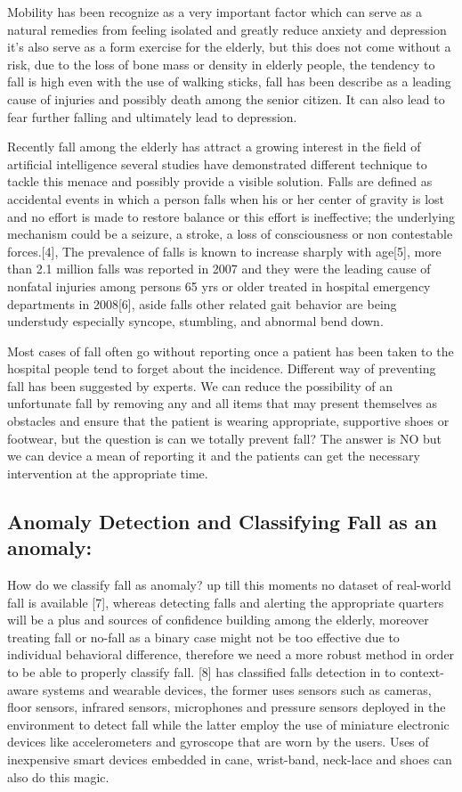 \documentclass[a4paper, parskip=full]{scrartcl}
\begin{document}
Mobility has been recognize as a very important factor which can serve as a natural remedies from feeling isolated and greatly reduce anxiety and depression it’s also serve as a form exercise for the elderly, but this does not come without a risk, due to the loss of bone mass or density in elderly people, the tendency to fall is high even with the use of walking sticks, fall has been describe as a leading cause of injuries and possibly death among the senior citizen. It can also lead to fear further falling and ultimately lead to depression.

Recently fall among the elderly has attract a growing interest in the field of artificial intelligence several studies have demonstrated different technique to tackle this menace and possibly provide a visible solution. Falls are defined as accidental events in which a person falls when his or her center of gravity is lost and no effort is made to restore balance or this effort is ineffective; the underlying mechanism could be a seizure, a stroke, a loss of consciousness or non contestable forces.[4], The prevalence of falls is known to increase sharply with age[5], more than 2.1 million falls was reported in 2007 and they were the leading cause of nonfatal injuries among persons 65 yrs or older treated in hospital emergency departments in 2008[6], aside falls other related gait behavior are being understudy especially syncope, stumbling, and abnormal bend down. 

Most cases of fall often go without reporting once a patient has been taken to the hospital people tend to forget about the incidence. Different way of preventing fall has been suggested by experts. We can reduce the possibility of an unfortunate fall by removing any and all items that may present themselves as obstacles and ensure that the patient is wearing appropriate, supportive shoes or footwear, but the question is can we totally prevent fall? The answer is NO but we can device a mean of reporting it and the patients can get the necessary intervention at the appropriate time.


\subsection*{Anomaly Detection and Classifying Fall as an anomaly:}

How do we classify fall as anomaly? up till this moments no dataset of real-world fall is available [7], whereas detecting falls and alerting the appropriate quarters will be a plus and sources of confidence building among the elderly, moreover treating fall or no-fall as a binary case might not be too effective due to individual behavioral difference, therefore we need a more robust method in order to be able to properly classify fall. [8]  has classified falls detection in to context-aware systems and wearable devices, the former uses sensors such as cameras, floor sensors, infrared sensors, microphones and pressure sensors deployed in the environment to detect fall while the latter employ the use of miniature electronic devices like accelerometers and gyroscope that are worn by the users. Uses of inexpensive smart devices embedded in cane, wrist-band, neck-lace and shoes can also do this magic.
\end{document}
